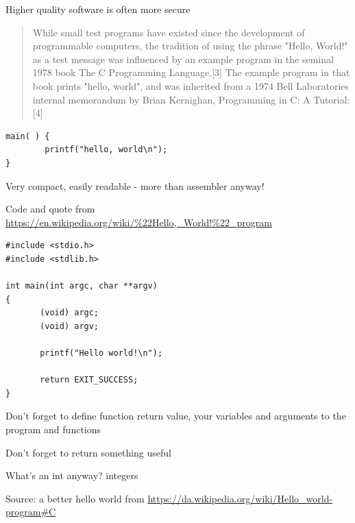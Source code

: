 \documentclass[Screen16to9,17pt]{foils}
\begin{document}


\centerline{Higher quality software is often more secure}



\begin{quote}
While small test programs have existed since the development of programmable computers, the tradition of using the phrase "Hello, World!" as a test message was influenced by an example program in the seminal 1978 book The C Programming Language.[3] The example program in that book prints "hello, world", and was inherited from a 1974 Bell Laboratories internal memorandum by Brian Kernighan, Programming in C: A Tutorial:[4]
\end{quote}

\begin{verbatim}
main( ) {
        printf("hello, world\n");
}
\end{verbatim}

\begin{list2}
\item Very compact, easily readable - more than assembler anyway!
\end{list2}

Code and quote from
\url{https://en.wikipedia.org/wiki/%22Hello,_World!%22_program}


\begin{verbatim}
#include <stdio.h>
#include <stdlib.h>

int main(int argc, char **argv)
{
       (void) argc;
       (void) argv;

       printf("Hello world!\n");

       return EXIT_SUCCESS;
}
\end{verbatim}

\begin{list2}
\item Don't forget to define function return value, your variables and arguments to the program and functions
\item Don't forget to return something useful
\item What's an int anyway? integers
\end{list2}

Source: a better hello world from \url{https://da.wikipedia.org/wiki/Hello_world-program#C}
\end{document}
